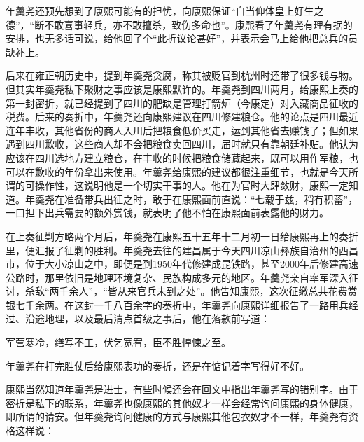 
年羹尧还预先想到了康熙可能有的担忧，向康熙保证“自当仰体皇上好生之德”，“断不敢喜事轻兵，亦不敢擅杀，致伤多命也”。康熙看了年羹尧有理有据的安排，也无多话可说，给他回了个“此折议论甚好”，并表示会马上给他把总兵的员缺补上。



后来在雍正朝历史中，提到年羹尧贪腐，称其被贬官到杭州时还带了很多钱与物。但其实年羹尧私下聚财之事应该是康熙默许的。年羹尧到四川两月，给康熙上奏的第一封密折，就已经提到了四川的肥缺是管理打箭炉（今康定）对入藏商品征收的税费。后来的奏折中，年羹尧还向康熙建议在四川修建粮仓。他的论点是四川最近连年丰收，其他省份的商人入川后把粮食低价买走，运到其他省去赚钱了；但如果遇到四川歉收，这些商人却不会把粮食卖回四川，届时就只有靠朝廷补贴。他认为应该在四川选地方建立粮仓，在丰收的时候把粮食储藏起来，既可以用作军粮，也可以在歉收的年份拿出来使用。年羹尧给康熙的建议都很注重细节，也就是今天所谓的可操作性，这说明他是一个切实干事的人。他在为官时大肆敛财，康熙一定知道。年羹尧在准备带兵出征之时，敢于在康熙面前直说：“七载于兹，稍有积蓄”，一口担下出兵需要的额外赏钱，就表明了他不怕在康熙面前表露他的财力。



在上奏征剿方略两个月后，年羹尧在康熙五十五年十二月初一日给康熙再上的奏折里，便汇报了征剿的胜利。年羹尧去往的建昌属于今天四川凉山彝族自治州的西昌市，位于大小凉山之中，即便是到1950年代修建成昆铁路，甚至2000年后修建高速公路时，那里依旧是地理环境复杂、民族构成多元的地区。年羹尧亲自率军深入征讨，杀敌“两千余人”，“皆从来官兵未到之处”。他告知康熙，这次征缴总共花费赏银七千余两。在这封一千八百余字的奏折中，年羹尧向康熙详细报告了一路用兵经过、沿途地理，以及最后清点首级之事后，他在落款前写道：



\begin{bookquote}军营寒冷，缮写不工，伏乞宽宥，臣不胜惶悚之至。\end{bookquote}


年羹尧在打完胜仗后给康熙表功的奏折，还是在惦记着字写得好不好。



康熙当然知道年羹尧是进士，有些时候还会在回文中指出年羹尧写的错别字。由于密折是私下的联系，年羹尧也像康熙的其他奴才一样会经常询问康熙的身体健康，即所谓的请安。但年羹尧询问健康的方式与康熙其他包衣奴才不一样，年羹尧有资格这样说：


